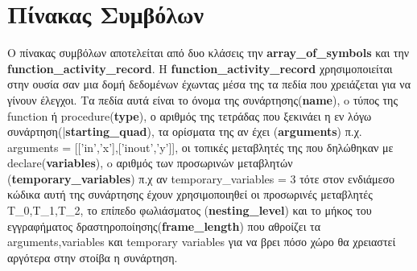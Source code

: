 \documentclass[12pt,a4paper,a4paper]{report}
\begin{document}
\chapter{Πίνακας Συμβόλων}
O πίνακας συμβόλων αποτελείται από δυο κλάσεις την \textbf{array\_of\_symbols} και την \textbf{function\_activity\_record}. H \textbf{function\_activity\_record} χρησιμοποιείται στην ουσία σαν μια δομή δεδομένων έχωντας μέσα της τα πεδία που χρειάζεται για να γίνουν έλεγχοι. Τα πεδία αυτά είναι το όνομα της συνάρτησης(\textbf{name}), o τύπος της function ή procedure(\textbf{type}), ο αριθμός της τετράδας που ξεκινάει η εν λόγω συνάρτηση(|\textbf{starting\_quad}), τα ορίσματα της αν έχει (\textbf{arguments}) π.χ. arguments =  [['in','x'],['inout','y']], οι τοπικές μεταβλητές της που δηλώθηκαν με declare(\textbf{variables}), o αριθμός των προσωρινών μεταβλητών (\textbf{temporary\_variables}) π.χ αν \newline temporary\_variables = 3 τότε στον ενδιάμεσο κώδικα αυτή της συνάρτησης έχουν χρησιμοποιηθεί οι προσωρινές μεταβλητές Τ\_0,Τ\_1,Τ\_2, το επίπεδο φωλιάσματος (\textbf{nesting\_level}) και το μήκος του εγγραφήματος δραστηροποίησης(\textbf{frame\_length}) που αθροίζει τα arguments,variables και temporary variables για να βρει πόσο χώρο θα χρειαστεί αργότερα στην στοίβα η συνάρτηση.
\end{document}

